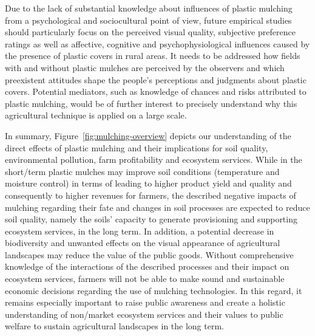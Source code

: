 Due to the lack of substantial knowledge about influences of plastic mulching from a psychological and sociocultural point of view, future empirical studies should particularly focus on the perceived visual quality, subjective preference ratings as well as affective, cognitive and psychophysiological influences caused by the presence of plastic covers in rural areas. It needs to be addressed how fields with and without plastic mulches are perceived by the observers and which preexistent attitudes shape the people's perceptions and judgments about plastic covers. Potential mediators, such as knowledge of chances and risks attributed to plastic mulching, would be of further interest to precisely understand why this agricultural technique is applied on a large scale.

In summary, Figure~\ref{fig:mulching-overview} depicts our understanding of the direct effects of plastic mulching and their implications for soil quality, environmental pollution, farm profitability and ecosystem services. While in the short\-/term plastic mulches may improve soil conditions (temperature and moisture control) in terms of leading to higher product yield and quality and consequently to higher revenues for farmers, the described negative impacts of mulching regarding their fate and changes in soil processes are expected to reduce soil quality, namely the soils' capacity to generate provisioning and supporting ecosystem services, in the long term. In addition, a potential decrease in biodiversity and unwanted effects on the visual appearance of agricultural landscapes may reduce the value of the public goods. Without comprehensive knowledge of the interactions of the described processes and their impact on ecosystem services, farmers will not be able to make sound and sustainable economic decisions regarding the use of mulching technologies. In this regard, it remains especially important to raise public awareness and create a holistic understanding of non\-/market ecosystem services and their values to public welfare to sustain agricultural landscapes in the long term.

